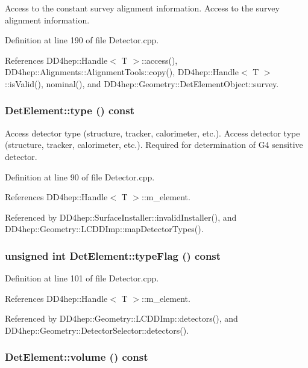 Access to the constant survey alignment information. Access to the survey alignment information. 

Definition at line 190 of file Detector.cpp.

References DD4hep::Handle$<$ T $>$::access(), DD4hep::Alignments::AlignmentTools::copy(), DD4hep::Handle$<$ T $>$::isValid(), nominal(), and DD4hep::Geometry::DetElementObject::survey.\hypertarget{class_d_d4hep_1_1_geometry_1_1_det_element_ac3f1002c4b640a796ebd1854507496ac}{
\subsubsection[{type}]{ DetElement::type () const}}
\label{class_d_d4hep_1_1_geometry_1_1_det_element_ac3f1002c4b640a796ebd1854507496ac}


Access detector type (structure, tracker, calorimeter, etc.). Access detector type (structure, tracker, calorimeter, etc.). Required for determination of G4 sensitive detector. 

Definition at line 90 of file Detector.cpp.

References DD4hep::Handle$<$ T $>$::m\_\-element.

Referenced by DD4hep::SurfaceInstaller::invalidInstaller(), and DD4hep::Geometry::LCDDImp::mapDetectorTypes().\hypertarget{class_d_d4hep_1_1_geometry_1_1_det_element_a7c6acb468c40a967e9e50a8efc2a620d}{
\subsubsection[{typeFlag}]{\setlength{\rightskip}{0pt plus 5cm}unsigned int DetElement::typeFlag () const}}
\label{class_d_d4hep_1_1_geometry_1_1_det_element_a7c6acb468c40a967e9e50a8efc2a620d}


Definition at line 101 of file Detector.cpp.

References DD4hep::Handle$<$ T $>$::m\_\-element.

Referenced by DD4hep::Geometry::LCDDImp::detectors(), and DD4hep::Geometry::DetectorSelector::detectors().\hypertarget{class_d_d4hep_1_1_geometry_1_1_det_element_a32d26062edede5aad146b6dbe3eef5be}{
\subsubsection[{volume}]{ DetElement::volume () const}}
\label{class_d_d4hep_1_1_geometry_1_1_det_element_a32d26062edede5aad146b6dbe3eef5be}


